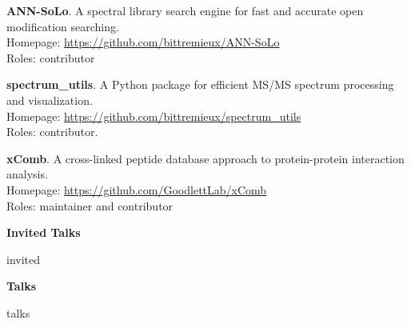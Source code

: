 \documentclass[11pt]{article}
\newcommand{\mysection}[1]{\vspace{1ex} \textbf{\large \textsf{#1} \quad \hrulefill}}
\newcommand{\myref}[1]{\href{#1}{\url{#1}}}
\begin{document}
{{\begin{etaremune}
  \item \textbf{ANN-SoLo}. A spectral library search engine for fast and
  accurate open modification searching. \\
  Homepage: \myref{https://github.com/bittremieux/ANN-SoLo} \\
  Roles: contributor
   
  \item \textbf{spectrum\_utils}. A Python package for efficient MS/MS spectrum
  processing and visualization. \\
  Homepage: \myref{https://github.com/bittremieux/spectrum_utils} \\
  Roles: contributor.

  \item \textbf{xComb}. A cross-linked peptide database approach to
  protein-protein interaction analysis. \\
  Homepage: \myref{https://github.com/GoodlettLab/xComb} \\
  Roles: maintainer and contributor

\end{etaremune}

\mysection{Invited Talks}
\begin{etaremune}
{{ invited }}
\end{etaremune}

\mysection{Talks}
\begin{etaremune}
{{ talks }}
\end{etaremune}





}}
\end{document}

